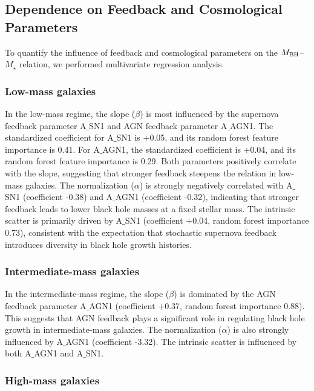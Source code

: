 \documentclass[twocolumn]{aastex631}
\begin{document}
\subsection{Dependence on Feedback and Cosmological Parameters}

To quantify the influence of feedback and cosmological parameters on the $M_{\rm BH}$--$M_{\star}$ relation, we performed multivariate regression analysis.

\subsubsection{Low-mass galaxies}

In the low-mass regime, the slope ($\beta$) is most influenced by the supernova feedback parameter A\ensuremath{\_}{SN1} and AGN feedback parameter A\ensuremath{\_}{AGN1}. The standardized coefficient for A\ensuremath{\_}{SN1} is +0.05, and its random forest feature importance is 0.41. For A\ensuremath{\_}{AGN1}, the standardized coefficient is +0.04, and its random forest feature importance is 0.29. Both parameters positively correlate with the slope, suggesting that stronger feedback steepens the relation in low-mass galaxies. The normalization ($\alpha$) is strongly negatively correlated with A\ensuremath{\_}{SN1} (coefficient -0.38) and A\ensuremath{\_}{AGN1} (coefficient -0.32), indicating that stronger feedback leads to lower black hole masses at a fixed stellar mass. The intrinsic scatter is primarily driven by A\ensuremath{\_}{SN1} (coefficient +0.04, random forest importance 0.73), consistent with the expectation that stochastic supernova feedback introduces diversity in black hole growth histories.

\subsubsection{Intermediate-mass galaxies}

In the intermediate-mass regime, the slope ($\beta$) is dominated by the AGN feedback parameter A\ensuremath{\_}{AGN1} (coefficient +0.37, random forest importance 0.88). This suggests that AGN feedback plays a significant role in regulating black hole growth in intermediate-mass galaxies. The normalization ($\alpha$) is also strongly influenced by A\ensuremath{\_}{AGN1} (coefficient -3.32). The intrinsic scatter is influenced by both A\ensuremath{\_}{AGN1} and A\ensuremath{\_}{SN1}.

\subsubsection{High-mass galaxies}
\end{document}

